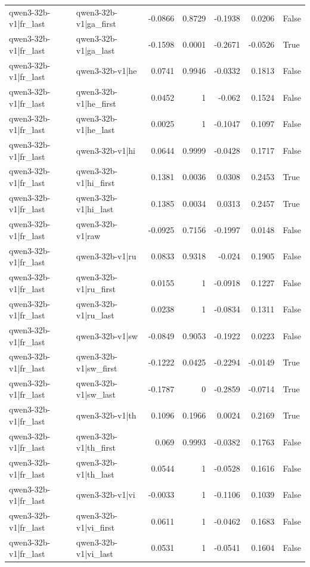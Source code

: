 \begin{table}
\begin{tabular}{l l r r r r l}
qwen3-32b-v1|fr_last & qwen3-32b-v1|ga_first & -0.0866 & 0.8729 & -0.1938 & 0.0206 & False \\
qwen3-32b-v1|fr_last & qwen3-32b-v1|ga_last & -0.1598 & 0.0001 & -0.2671 & -0.0526 & True \\
qwen3-32b-v1|fr_last & qwen3-32b-v1|he & 0.0741 & 0.9946 & -0.0332 & 0.1813 & False \\
qwen3-32b-v1|fr_last & qwen3-32b-v1|he_first & 0.0452 & 1 & -0.062 & 0.1524 & False \\
qwen3-32b-v1|fr_last & qwen3-32b-v1|he_last & 0.0025 & 1 & -0.1047 & 0.1097 & False \\
qwen3-32b-v1|fr_last & qwen3-32b-v1|hi & 0.0644 & 0.9999 & -0.0428 & 0.1717 & False \\
qwen3-32b-v1|fr_last & qwen3-32b-v1|hi_first & 0.1381 & 0.0036 & 0.0308 & 0.2453 & True \\
qwen3-32b-v1|fr_last & qwen3-32b-v1|hi_last & 0.1385 & 0.0034 & 0.0313 & 0.2457 & True \\
qwen3-32b-v1|fr_last & qwen3-32b-v1|raw & -0.0925 & 0.7156 & -0.1997 & 0.0148 & False \\
qwen3-32b-v1|fr_last & qwen3-32b-v1|ru & 0.0833 & 0.9318 & -0.024 & 0.1905 & False \\
qwen3-32b-v1|fr_last & qwen3-32b-v1|ru_first & 0.0155 & 1 & -0.0918 & 0.1227 & False \\
qwen3-32b-v1|fr_last & qwen3-32b-v1|ru_last & 0.0238 & 1 & -0.0834 & 0.1311 & False \\
qwen3-32b-v1|fr_last & qwen3-32b-v1|sw & -0.0849 & 0.9053 & -0.1922 & 0.0223 & False \\
qwen3-32b-v1|fr_last & qwen3-32b-v1|sw_first & -0.1222 & 0.0425 & -0.2294 & -0.0149 & True \\
qwen3-32b-v1|fr_last & qwen3-32b-v1|sw_last & -0.1787 & 0 & -0.2859 & -0.0714 & True \\
qwen3-32b-v1|fr_last & qwen3-32b-v1|th & 0.1096 & 0.1966 & 0.0024 & 0.2169 & True \\
qwen3-32b-v1|fr_last & qwen3-32b-v1|th_first & 0.069 & 0.9993 & -0.0382 & 0.1763 & False \\
qwen3-32b-v1|fr_last & qwen3-32b-v1|th_last & 0.0544 & 1 & -0.0528 & 0.1616 & False \\
qwen3-32b-v1|fr_last & qwen3-32b-v1|vi & -0.0033 & 1 & -0.1106 & 0.1039 & False \\
qwen3-32b-v1|fr_last & qwen3-32b-v1|vi_first & 0.0611 & 1 & -0.0462 & 0.1683 & False \\
qwen3-32b-v1|fr_last & qwen3-32b-v1|vi_last & 0.0531 & 1 & -0.0541 & 0.1604 & False \\

\end{tabular}
\end{table}
